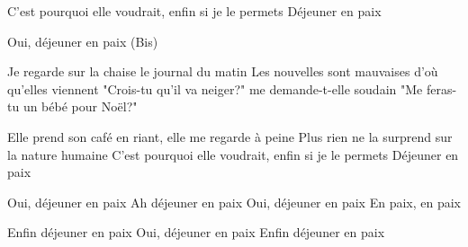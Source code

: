C'est pourquoi elle voudrait, enfin si je le permets
Déjeuner en paix
\endverse

\beginverse
Oui, déjeuner en paix
(Bis)
\endverse

\beginverse
Je regarde sur la chaise le journal du matin
Les nouvelles sont mauvaises d'où qu'elles viennent
"Crois-tu qu'il va neiger?" me demande-t-elle soudain
"Me feras-tu un bébé pour Noël?"
\endverse

\beginverse
Elle prend son café en riant, elle me regarde à peine
Plus rien ne la surprend sur la nature humaine
C'est pourquoi elle voudrait, enfin si je le permets
Déjeuner en paix
\endverse

\beginverse
Oui, déjeuner en paix
Ah déjeuner en paix
Oui, déjeuner en paix
En paix, en paix
\endverse

\beginverse
Enfin déjeuner en paix
Oui, déjeuner en paix
Enfin déjeuner en paix
\]\]\]\]\]\]\]\]\]\]\]\]\]\]\]\]\]\]\]\]\]\]\]\]\]\]\]\]\]\]\]\]\]\]\]\]\]\]\]\]\]\]\]\]\]\]\]\]\]\]\]\]\]\]\]\]\]\]\]\]\]\]\]\]\]\]\]\]\]\]\]\]\]\]\]\]\]\]\]\]\]\]\]\]\]\]\]\]\]\]\]\]\]\]\]\]\]\]\]\]\]\]\]\]\]\]\]\]\]\]\]\]\]\]\]\]\]\]\]\]\]\]\]\]\]\]\]\]\]\]\]\]\]\]\]\]\]\]\]\]\]\]\]\]\]\]\]\]\]\]\]\]\]\]\]\]\]\]\]\]\]\]\]\]\]\]\]\]\]\]\]\]\]\]\]\]\]\]\]\]\]\]\]\]\]\]\]\]\]\]\]\]\]\]\]\]\]\]\]\]\]\]\]\]\]\]\]\]\]\]\]\]\]\]\]\]\]\]\]\]\]\]\]\]\]\]\]\]\]\]\]\]\]\]\]\]\]\]\]\]\]\]\]\]\]\]\]\]\]\]\]\]\]\]\]\]\]\]\]\]\]\]\]\]\]\]\]\]\]\]\]\]\]\]\]\]\]\]\]\]\]\]\]\]\]\]\]\]\]\]\]\]\]\]\]\]\]\]\]\]\]\]\]\]\]\]\]\]\]\]\]\]\]\]\]\]\]\]\]\]\]\]\]\]\]\]\]\]\]\]\]\]\]\]\]\]\]\]\]\]\]\]\]\]\]\]\]\]\]\]\]\]\]\]\]\]\]\]\]\]\]\]\]\]\]\]\]\]\]\]\]\]\]\]\]\]\]\]\]\]\]\]\]\]\]\]\]\]\]\]\]\]\]\]\]\]\]\]\]\]\]\]\]\]\]\]\]\]\]\]\]\]\]\]\]\]\]\]\]\]\]\]\]\]\]\]\]\]\]\]\]\]\]\]\]\]\]\]\]\]\]\]\]\]\]\]\]\]\]\]\]\]\]\]\]\]\]\]\]\]\]\]\]\]\]\]\]\]\]\]\]\]\]\]\]\]\]\]\]\]\]\]\]\]\]\]\]\]\]\]\]\]\]\]\]\]\]\]\]\]\]\]\]\]\]\]\]\]\]\]\]\]\]\]\]\]\]\]\]\]\]\]\]\]\]\]\]\]\]\]\]\]\]\]\]\]\]\]\]\]\]\]\]\]\]\]\]\]\]\]\]\]\]\]\]\]\]\]\]\]\]\]\]\]\]\]\]\]\]\]\]\]\]\]\]\]\]\]\]\]\]\]\]\]\]\]\]\]\]\]\]\]\]\]\]\]\]\]\]\]\]\]\]\]\]\]\]\]\]\]\]\]\]\]\]\]\]\]\]\]\]\]\]\]\]\]\]\]\]\]\]\]\]\]\]\]\]\]\]\]\]\]\]\]\]\]\]\]\]\]\]\]\]\]\]\]\]\]\]\]\]\]\]\]\]\]\]\]\]\]\]\]\]\]\]\]\]\]\]\]\]\]\]\]\]\]\]\]\]\]\]\]\]\]\]\]\]\]\]\]\]\]\]\]\]\]\]\]\]\]\]\]\]\]\]\]\]\]\]\]\]\]\]\]\]\]\]\]\]\]\]\]\]\]\]\]\]\]\]\]\]\]\]\]\]\]\]\]\]\]\]\]\]\]\]\]\]\]\]\]\]\]\]\]\]\]\]\]\]\]\]\]\]\]\]\]\]\]\]\]\]\]\]\]\]\]\]\]\]\]\]\]\]\]\]\]\]\]\]\]\]\]\]\]\]\]\]\]\]\]\]\]\]\]\]\]\]\]\]\]\]\]\]\]\]\]\]\]\]\]\]\]\]\]\]\]\]\]\]\]\]\]\]\]\]\]\]\]\]\]\]\]\]\]\]\]\]\]\]\]\]\]\]\]\]\]\]\]\]\]\]\]\]\]\]\]\]\]\]\]\]\]\]\]\]\]\]\]\]\]\]\]\]\]\]\]\]\]\]\]\]\]\]\]\]\]\]\]\]\]\]\]\]\]\]\]\]\]\]\]\]\]\]\]\]\]\]\]\]\]\]\]\]\]\]\]\]\]\]\]\]\]\]\]\]\]\]\]\]\]\]\]\]\]\]\]\]\]\]\]\]\]\]\]\]\]\]\]\]\]\]\]\]\]\]\]\]\]\]\]\]\]\]\]\]\]\]\]\]\]\]\]\]\]\]\]\]\]\]\]\]\]\]\]\]\]\]\]\]\]\]\]\]\]\]\]\]\]\]\]\]\]\]\]\]\]\]\]\]\]\]\]\]\]\]\]\]\]\]\]\]\]\]\]\]\]\]\]\]\]\]\]\]\]\]\]\]\]\]\]\]\]\]\]\]\]\]\]\]\]\]\]\]\]\]\]\]\]\]\]\]\]\]\]\]\]\]\]\]\]\]\]\]\]\]\]\]\]\]\]\]\]\]\]\]\]\]\]\]\]\]\]\]\]\]\]\]\]\]\]\]\]\]\]\]\]\]\]\]\]\]\]\]\]\]\]\]\]\]\]\]\]\]\]\]\]\]\]\]\]\]\]\]\]\]\]\]\]\]\]\]\]\]\]\]\]\]\]\]\]\]\]\]\]\]\]\]\]\]\]\]\]\]\]\]\]\]\]\]\]\]\]\]\]\]\]\]\]\]\]\]\]\]\]\]\]\]\]\]\]\]\]\]\]\]\]\]\]\]\]\]\]\]\]\]\]\]\]\]\]\]\]\]\]\]\]\]\]\]
